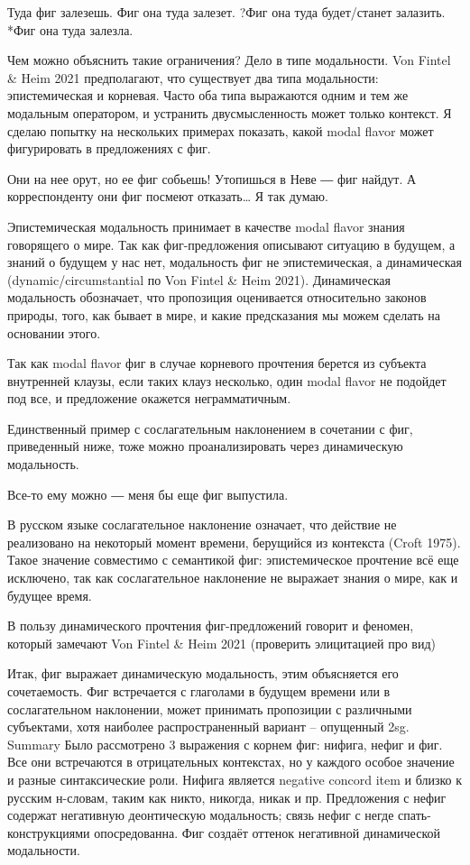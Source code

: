 \documentclass{article}
\begin{document}
Туда фиг залезешь.
Фиг она туда залезет.
?Фиг она туда будет/станет залазить.
*Фиг она туда залезла.

Чем можно объяснить такие ограничения? Дело в типе модальности. Von Fintel \& Heim 2021 предполагают, что существует два типа модальности: эпистемическая и корневая. Часто оба типа выражаются одним и тем же модальным оператором, и устранить двусмысленность может только контекст. Я сделаю попытку на нескольких примерах показать, какой modal flavor может фигурировать в предложениях с фиг.

Они на нее орут, но ее фиг собьешь!
Утопишься в Неве ― фиг найдут.
А корреспонденту они фиг посмеют отказать… Я так думаю.

Эпистемическая модальность принимает в качестве modal flavor знания говорящего о мире. Так как фиг-предложения описывают ситуацию в будущем, а знаний о будущем у нас нет, модальность фиг не эпистемическая, а динамическая (dynamic/circumstantial по Von Fintel \& Heim 2021). Динамическая модальность обозначает, что пропозиция оценивается относительно законов природы, того, как бывает в мире, и какие предсказания мы можем сделать на основании этого.

Так как modal flavor фиг в случае корневого прочтения берется из субъекта внутренней клаузы, если таких клауз несколько, один modal flavor не подойдет под все, и предложение окажется неграмматичным.

Единственный пример с сослагательным наклонением в сочетании с фиг, приведенный ниже, тоже можно проанализировать через динамическую модальность.

Все-то ему можно ― меня бы еще фиг выпустила.

В русском языке сослагательное наклонение означает, что действие не реализовано на некоторый момент времени, берущийся из контекста (Croft 1975). Такое значение совместимо с семантикой фиг: эпистемическое прочтение всё еще исключено, так как сослагательное наклонение не выражает знания о мире, как и будущее время.

В пользу динамического прочтения фиг-предложений говорит и феномен, который замечают Von Fintel \& Heim 2021 (проверить элицитацией про вид)

Итак, фиг выражает динамическую модальность, этим объясняется его сочетаемость. Фиг встречается с глаголами в будущем времени или в сослагательном наклонении, может принимать пропозиции с различными субъектами, хотя наиболее распространенный вариант -- опущенный 2sg.
Summary
Было рассмотрено 3 выражения с корнем фиг: нифига, нефиг и фиг. Все они встречаются в отрицательных контекстах, но у каждого особое значение и разные синтаксические роли. Нифига является negative concord item и близко к русским н-словам, таким как никто, никогда, никак и пр. Предложения с нефиг содержат негативную деонтическую модальность; связь нефиг с негде спать-конструкциями опосредованна. Фиг создаёт оттенок негативной динамической модальности.
\end{document}
